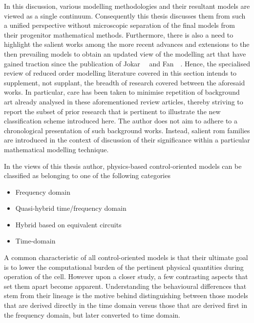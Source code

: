 In this discussion,  various modelling methodologies and  their resultant models
are viewed as  a single continuum. Consequently this thesis  discusses them from
such a  unified perspective without  microscopic separation of the  final models
from their progenitor mathematical methods. Furthermore, there is also a need to
highlight the salient works among the more recent advances and extensions to the
then  prevailing models  to obtain  an updated  view of  the modelling  art that
have  gained  traction  since the  publication  of  Jokar~\etal~\cite{Jokar2016}
and  Fan~\etal~\cite{Fan2015}. Hence,  the specialised  review of  reduced order
modelling  literature  covered  in  this  section  intends  to  supplement,  not
supplant,  the breadth  of  research  covered between  the  aforesaid works.  In
particular, care has been taken to minimise repetition of background art already
analysed in these aforementioned review articles, thereby striving to report the
subset of prior research that is  pertinent to illustrate the new classification
scheme introduced  here. The author  does not aim  to adhere to  a chronological
presentation of such  background works. Instead, salient  \gls{rom} families are
introduced  in  the  context  of  discussion  of  their  significance  within  a
particular mathematical modelling technique.

In the views of this thesis author, physics-based control-oriented models can be
classified as belonging to one of the following categories %
\begin{itemize}[topsep=5pt, partopsep=5pt, parsep=5pt, itemsep=5pt]
    \item Frequency domain 
    \item Quasi-hybrid time/frequency domain 
    \item Hybrid  based on equivalent circuits
    \item Time-domain 
\end{itemize}

A common characteristic of all control-oriented models is that their ultimate
goal is to lower the computational burden of the pertinent physical quantities
during operation of the cell.  However upon a closer study, a few contrasting
aspects that set them apart become apparent. Understanding the behavioural
differences that stem from their lineage is the motive behind distinguishing
between those models that are derived directly in the time  domain versus  those
that  are derived first  in the  frequency domain, but  later  converted  to
time  domain.

